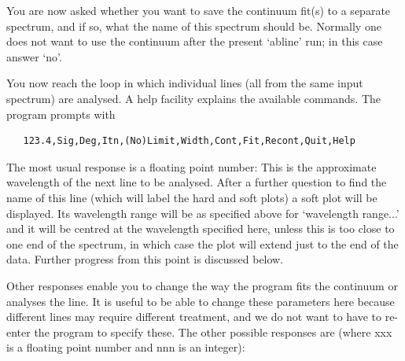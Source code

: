 \documentclass[11pt,twoside]{article}
\begin{document}
   You are now asked whether you want to save the continuum fit(s) to a
   separate spectrum, and if so, what the name of this spectrum should
   be. Normally one does not want to use the continuum after the present
   `abline' run; in this case answer `no'.

   You now reach the loop in which individual lines (all from the same
   input spectrum) are analysed. A help facility explains the available
   commands. The program prompts with

\begin{verbatim}
   123.4,Sig,Deg,Itn,(No)Limit,Width,Cont,Fit,Recont,Quit,Help
\end{verbatim}

   The most usual response is a floating point number: This is the
   approximate wavelength of the next line to be analysed. After a
   further question to find the name of this line (which will label the
   hard and soft plots) a soft plot will be displayed. Its wavelength
   range will be as specified above for `wavelength range...' and it
   will be centred at the wavelength specified here, unless this is too
   close to one end of the spectrum, in which case the plot will extend
   just to the end of the data. Further progress from this point is
   discussed below.

   Other responses enable you to change the way the program fits the
   continuum or analyses the line. It is useful to be able to change
   these parameters here because different lines may require different
   treatment, and we do not want to have to re-enter the program to
   specify these. The other possible responses are (where xxx is a
   floating point number and nnn is an integer):
\end{document}
